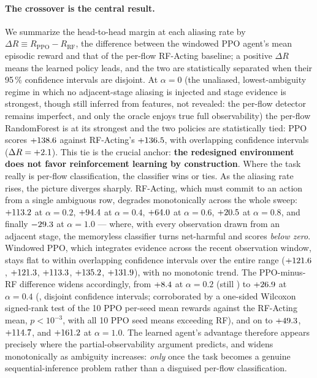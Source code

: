 \paragraph{The crossover is the central result.} We summarize the head-to-head margin at each aliasing rate by $\Delta R \equiv R_{\mathrm{PPO}} - R_{\mathrm{RF}}$, the difference between the windowed PPO agent's mean episodic reward and that of the per-flow RF-Acting baseline; a positive $\Delta R$ means the learned policy leads, and the two are statistically separated when their 95\,\% confidence intervals are disjoint. At $\alpha = 0$ (the unaliased, lowest-ambiguity regime in which no adjacent-stage aliasing is injected and stage evidence is strongest, though still inferred from features, not revealed: the per-flow detector remains imperfect, and only the oracle enjoys true full observability) the per-flow RandomForest is at its strongest and the two policies are statistically tied: PPO scores $+138.6$ against RF-Acting's $+136.5$, with overlapping confidence intervals ($\Delta R = +2.1$). This tie is the crucial anchor: \textbf{the redesigned environment does not favor reinforcement learning by construction}. Where the task really is per-flow classification, the classifier wins or ties. As the aliasing rate rises, the picture diverges sharply. RF-Acting, which must commit to an action from a single ambiguous row, degrades monotonically across the whole sweep: $+113.2$ at $\alpha = 0.2$, $+94.4$ at $\alpha = 0.4$, $+64.0$ at $\alpha = 0.6$, $+20.5$ at $\alpha = 0.8$, and finally $-29.3$ at $\alpha = 1.0$ --- where, with every observation drawn from an adjacent stage, the memoryless classifier turns net-harmful and scores \emph{below zero}. Windowed PPO, which integrates evidence across the recent observation window, stays flat to within overlapping confidence intervals over the entire range ($+121.6$, $+121.3$, $+113.3$, $+135.2$, $+131.9$), with no monotonic trend. The PPO-minus-RF difference widens accordingly, from $+8.4$ at $\alpha = 0.2$ (still \AlphaTwoVerdict{}) to $+26.9$ at $\alpha = 0.4$ (\AlphaFourVerdict{}, disjoint confidence intervals; corroborated by a one-sided Wilcoxon signed-rank test of the 10 PPO per-seed mean rewards against the RF-Acting mean, $p < 10^{-3}$, with all 10 PPO seed means exceeding RF), and on to $+49.3$, $+114.7$, and $+161.2$ at $\alpha = 1.0$. The learned agent's advantage therefore appears precisely where the partial-observability argument predicts, and widens monotonically as ambiguity increases: \emph{only} once the task becomes a genuine sequential-inference problem rather than a disguised per-flow classification.


